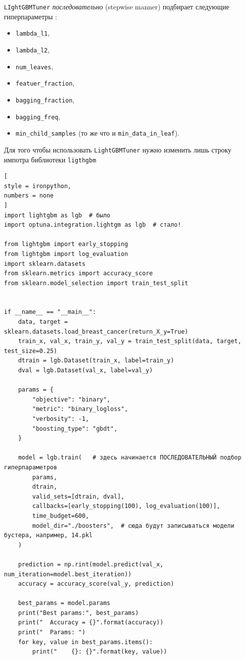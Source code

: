 \documentclass[%
	11pt,
	a4paper,
	utf8,
		]{article}
\begin{document}
\verb|LIghtGBMTuner| \emph{последовательно} (stepwise manner) подбирает следующие гиперпараметры :
\begin{itemize}
	\item \verb|lambda_l1|,
	
	\item \verb|lambda_l2|,
	
	\item \verb|num_leaves|,
	
	\item \verb|featuer_fraction|,
	
	\item \verb|bagging_fraction|,
	
	\item \verb|bagging_freq|,
	
	\item \verb|min_child_samples| (то же что и \verb|min_data_in_leaf|).
\end{itemize}

Для того чтобы использовать \verb|LightGBMTuner| нужно изменить лишь строку импотра библиотеки \verb|ligthgbm|

\begin{lstlisting}[
style = ironpython,
numbers = none
]
import lightgbm as lgb  # было
import optuna.integration.lightgm as lgb  # стало!

from lightgbm import early_stopping
from lightgbm import log_evaluation
import sklearn.datasets
from sklearn.metrics import accuracy_score
from sklearn.model_selection import train_test_split


if __name__ == "__main__":
	data, target = sklearn.datasets.load_breast_cancer(return_X_y=True)
	train_x, val_x, train_y, val_y = train_test_split(data, target, test_size=0.25)
	dtrain = lgb.Dataset(train_x, label=train_y)
	dval = lgb.Dataset(val_x, label=val_y)

	params = {
		"objective": "binary",
		"metric": "binary_logloss",
		"verbosity": -1,
		"boosting_type": "gbdt",
	}

	model = lgb.train(   # здесь начинается ПОСЛЕДОВАТЕЛЬНЫЙ подбор гиперпараметров
		params,
		dtrain,
		valid_sets=[dtrain, dval],
		callbacks=[early_stopping(100), log_evaluation(100)],
		time_budget=600,
		model_dir="./boosters",  # сюда будут записываться модели бустера, например, 14.pkl
	)
	
	prediction = np.rint(model.predict(val_x, num_iteration=model.best_iteration))
	accuracy = accuracy_score(val_y, prediction)
	
	best_params = model.params
	print("Best params:", best_params)
	print("  Accuracy = {}".format(accuracy))
	print("  Params: ")
	for key, value in best_params.items():
		print("    {}: {}".format(key, value))
\end{lstlisting}
\end{document}
